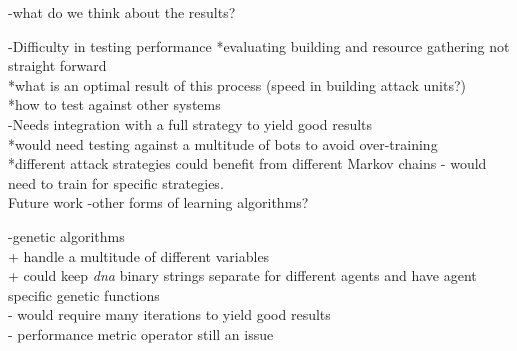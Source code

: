 -what do we think about the results?

-Difficulty in testing performance
 *evaluating building and resource gathering not straight forward\\
 *what is an optimal result of this process (speed in building attack units?)\\
 *how to test against other systems\\

-Needs integration with a full strategy to yield good results\\
 *would need testing against a multitude of bots to avoid over-training\\
 *different attack strategies could benefit from different Markov chains - would need to train for specific strategies.\\

Future work -other forms of learning algorithms?


-genetic algorithms\\
 + handle a multitude of different variables\\
 + could keep \textit{dna} binary strings separate for different agents and have agent specific genetic functions\\
 - would require many iterations to yield good results\\
 - performance metric operator still an issue